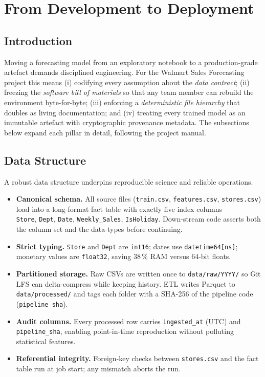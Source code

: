 %
%
%


\chapter{From Development to Deployment}

\section{Introduction}
Moving a forecasting model from an exploratory notebook to a production-grade artefact demands disciplined engineering.  
For the Walmart Sales Forecasting project this means  
(i) codifying every assumption about the \emph{data contract};  
(ii) freezing the \emph{software bill of materials} so that any team member can rebuild the environment byte-for-byte;  
(iii) enforcing a \emph{deterministic file hierarchy} that doubles as living documentation; and  
(iv) treating every trained model as an immutable artefact with cryptographic provenance metadata.  
The subsections below expand each pillar in detail, following the project manual\cite{Box:2016}\cite{Montgomery:2008}\cite{Guyon:2003}.

\section{Data Structure} %
A robust data structure underpins reproducible science and reliable operations.

\begin{itemize}
	\item \textbf{Canonical schema.}  All source files (\verb|train.csv|, \verb|features.csv|, \verb|stores.csv|) load into a long-format fact table with exactly five index columns\\
	\verb|Store|, \verb|Dept|, \verb|Date|, \verb|Weekly_Sales|, \verb|IsHoliday|.  
	Down-stream code asserts both the column set and the data-types before continuing.
	\item \textbf{Strict typing.}  \verb|Store| and \verb|Dept| are \verb|int16|; dates use \verb|datetime64[ns]|; monetary values are \verb|float32|, saving \mbox{38\,\%} RAM versus 64-bit floats.
	\item \textbf{Partitioned storage.}  Raw CSVs are written once to \verb|data/raw/YYYY/| so Git LFS can delta-compress while keeping history.  
	ETL writes Parquet to \verb|data/processed/| and tags each folder with a SHA-256 of the pipeline code (\verb|pipeline_sha|).
	\item \textbf{Audit columns.}  Every processed row carries \verb|ingested_at| (UTC) and \verb|pipeline_sha|, enabling point-in-time reproduction without polluting statistical features.
	\item \textbf{Referential integrity.}  Foreign-key checks between \verb|stores.csv| and the fact table run at job start; any mismatch aborts the run.
\end{itemize}


